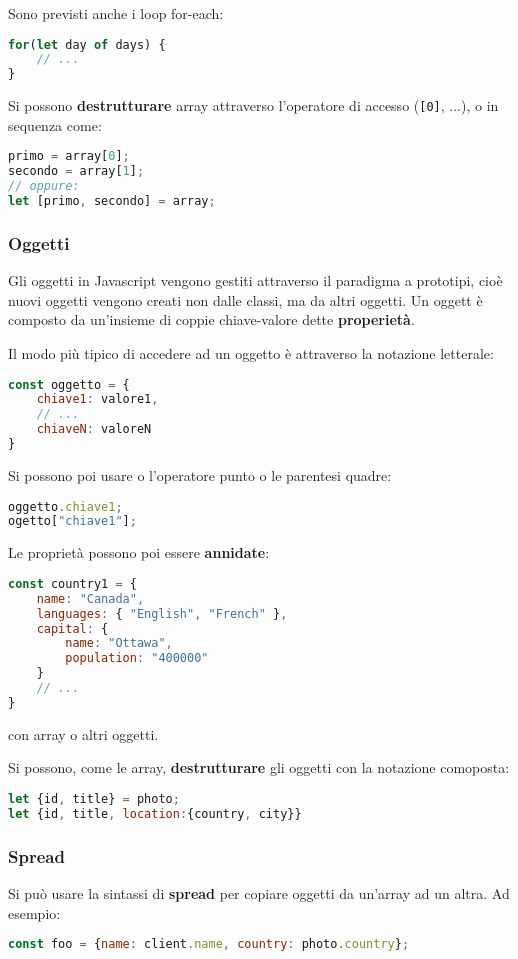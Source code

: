 \documentclass[a4paper,11pt]{article}
\begin{document}
Sono previsti anche i loop for-each:
\begin{lstlisting}[language=javascript, style=codestyle]	
for(let day of days) {
	// ...
}
\end{lstlisting}

Si possono \textbf{destrutturare} array attraverso l'operatore di accesso (\lstinline|[0]|, ...), o in sequenza come:
\begin{lstlisting}[language=javascript, style=codestyle]	
primo = array[0];
secondo = array[1];
// oppure:
let [primo, secondo] = array;
\end{lstlisting}

\subsubsection{Oggetti}
Gli oggetti in Javascript vengono gestiti attraverso il paradigma a prototipi, cioè nuovi oggetti vengono creati non dalle classi, ma da altri oggetti.
Un oggett è composto da un'insieme di coppie chiave-valore dette \textbf{properietà}.

Il modo più tipico di accedere ad un oggetto è attraverso la notazione letterale:
\begin{lstlisting}[language=javascript, style=codestyle]	
const oggetto = {
	chiave1: valore1,
	// ...
	chiaveN: valoreN
}
\end{lstlisting}

Si possono poi usare o l'operatore punto o le parentesi quadre:
\begin{lstlisting}[language=javascript, style=codestyle]	
oggetto.chiave1;
ogetto["chiave1"];
\end{lstlisting}

Le proprietà possono poi essere \textbf{annidate}:
\begin{lstlisting}[language=javascript, style=codestyle]	
const country1 = {
	name: "Canada",
	languages: { "English", "French" },
	capital: {
		name: "Ottawa",
		population: "400000"
	}
	// ...
}
\end{lstlisting}
con array o altri oggetti.

Si possono, come le array, \textbf{destrutturare} gli oggetti con la notazione comoposta:
\begin{lstlisting}[language=javascript, style=codestyle]	
let {id, title} = photo;
let {id, title, location:{country, city}}
\end{lstlisting}

\subsubsection{Spread}
Si può usare la sintassi di \textbf{spread} per copiare oggetti da un'array ad un altra. Ad esempio:
\begin{lstlisting}[language=javascript, style=codestyle]	
const foo = {name: client.name, country: photo.country};
\end{lstlisting}
\end{document}

